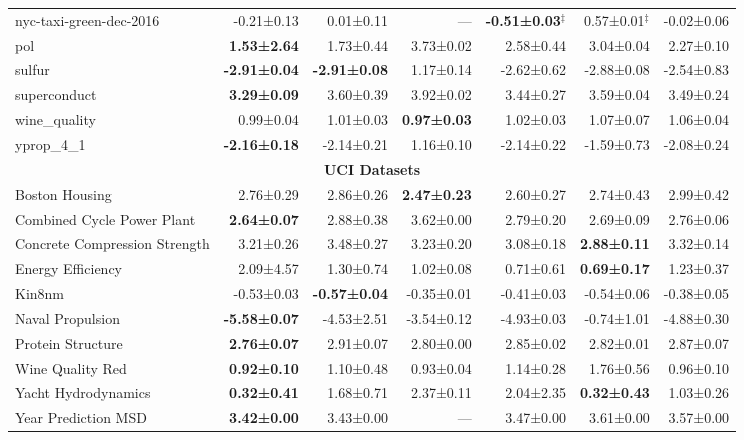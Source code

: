 \begin{table}[h!]
{\begin{tabular}{lrrrrrr}
      nyc-taxi-green-dec-2016 & -0.21±0.13 & 0.01±0.11 & --- & \textbf{-0.51±0.03}$^{\ddagger}$ & 0.57±0.01$^{\ddagger}$ & -0.02±0.06 \\
      pol & \textbf{1.53±2.64} & 1.73±0.44 & 3.73±0.02 & 2.58±0.44 & 3.04±0.04 & 2.27±0.10 \\
      sulfur & \textbf{-2.91±0.04} & \textbf{-2.91±0.08} & 1.17±0.14 & -2.62±0.62 & -2.88±0.08 & -2.54±0.83 \\
      superconduct & \textbf{3.29±0.09} & 3.60±0.39 & 3.92±0.02 & 3.44±0.27 & 3.59±0.04 & 3.49±0.24 \\
      wine\_quality & 0.99±0.04 & 1.01±0.03 & \textbf{0.97±0.03} & 1.02±0.03 & 1.07±0.07 & 1.06±0.04 \\
      yprop\_4\_1 & \textbf{-2.16±0.18} & -2.14±0.21 & 1.16±0.10 & -2.14±0.22 & -1.59±0.73 & -2.08±0.24 \\
      \midrule
      \multicolumn{7}{c}{\textbf{UCI Datasets}} \\
      \midrule
      Boston Housing & 2.76±0.29 & 2.86±0.26 & \textbf{2.47±0.23} & 2.60±0.27 & 2.74±0.43 & 2.99±0.42 \\
      Combined Cycle Power Plant & \textbf{2.64±0.07} & 2.88±0.38 & 3.62±0.00 & 2.79±0.20 & 2.69±0.09 & 2.76±0.06 \\
      Concrete Compression Strength & 3.21±0.26 & 3.48±0.27 & 3.23±0.20 & 3.08±0.18 & \textbf{2.88±0.11} & 3.32±0.14 \\
      Energy Efficiency & 2.09±4.57 & 1.30±0.74 & 1.02±0.08 & 0.71±0.61 & \textbf{0.69±0.17} & 1.23±0.37 \\
      Kin8nm & -0.53±0.03 & \textbf{-0.57±0.04} & -0.35±0.01 & -0.41±0.03 & -0.54±0.06 & -0.38±0.05 \\
      Naval Propulsion & \textbf{-5.58±0.07} & -4.53±2.51 & -3.54±0.12 & -4.93±0.03 & -0.74±1.01 & -4.88±0.30 \\
      Protein Structure & \textbf{2.76±0.07} & 2.91±0.07 & 2.80±0.00 & 2.85±0.02 & 2.82±0.01 & 2.87±0.07 \\
      Wine Quality Red & \textbf{0.92±0.10} & 1.10±0.48 & 0.93±0.04 & 1.14±0.28 & 1.76±0.56 & 0.96±0.10 \\
      Yacht Hydrodynamics & \textbf{0.32±0.41} & 1.68±0.71 & 2.37±0.11 & 2.04±2.35 & \textbf{0.32±0.43} & 1.03±0.26 \\
      Year Prediction MSD & \textbf{3.42±0.00} & 3.43±0.00 & --- & 3.47±0.00 & 3.61±0.00 & 3.57±0.00 \\
      \bottomrule
      \end{tabular}%
    }
\end{table}
